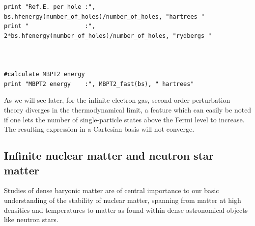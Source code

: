 \documentclass[%
oneside,                 %
final,                   %
10pt]{article}
\newenvironment{doconceexercise}{}{}
\begin{document}
\begin{doconceexercise}
\begin{verbatim}
print "Ref.E. per hole :", bs.hfenergy(number_of_holes)/number_of_holes, "hartrees "
print "                :", 2*bs.hfenergy(number_of_holes)/number_of_holes, "rydbergs "



#calculate MBPT2 energy
print "MBPT2 energy    :", MBPT2_fast(bs), " hartrees"
\end{verbatim}

As we will see later, for the infinite electron gas, second-order perturbation theory diverges in the thermodynamical limit, a feature which can easily be noted if one lets the number of single-particle states above the Fermi level to increase. The resulting expression in a Cartesian basis will not converge.




\end{doconceexercise}


\subsection*{Infinite nuclear matter and neutron star matter}

Studies of dense baryonic matter are of central importance to our basic understanding 
of the stability of nuclear matter, spanning from matter at high densities and temperatures
to matter as found within dense astronomical objects  like neutron stars. 
\end{document}
